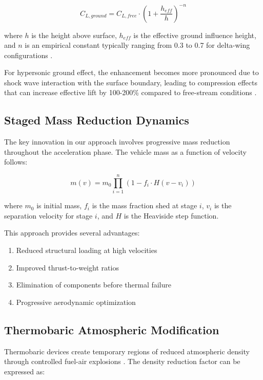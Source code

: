 \documentclass[12pt,a4paper]{article}
\begin{document}
\begin{equation}
C_{L,ground} = C_{L,free} \cdot \left(1 + \frac{h_{eff}}{h}\right)^{-n}
\label{eq:ground_effect}
\end{equation}

where $h$ is the height above surface, $h_{eff}$ is the effective ground influence height, and $n$ is an empirical constant typically ranging from 0.3 to 0.7 for delta-wing configurations \cite{widnall1970ground}.

For hypersonic ground effect, the enhancement becomes more pronounced due to shock wave interaction with the surface boundary, leading to compression effects that can increase effective lift by 100-200\% compared to free-stream conditions \cite{rasmussen1982hypersonic}.

\subsection{Staged Mass Reduction Dynamics}

The key innovation in our approach involves progressive mass reduction throughout the acceleration phase. The vehicle mass as a function of velocity follows:

\begin{equation}
m(v) = m_0 \prod_{i=1}^{n} \left(1 - f_i \cdot H(v - v_i)\right)
\label{eq:mass_reduction}
\end{equation}

where $m_0$ is initial mass, $f_i$ is the mass fraction shed at stage $i$, $v_i$ is the separation velocity for stage $i$, and $H$ is the Heaviside step function.

This approach provides several advantages:
\begin{enumerate}
\item Reduced structural loading at high velocities
\item Improved thrust-to-weight ratios
\item Elimination of components before thermal failure
\item Progressive aerodynamic optimization
\end{enumerate}

\subsection{Thermobaric Atmospheric Modification}

Thermobaric devices create temporary regions of reduced atmospheric density through controlled fuel-air explosions \cite{nettleton1987thermobaric, zhang2011thermobaric}. The density reduction factor can be expressed as:
\end{document}
